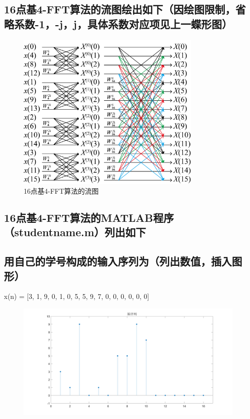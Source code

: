 \documentclass{../source/Experiment}
\begin{document}
\subsection{16点基4-FFT算法的流图绘出如下（因绘图限制，省略系数-1，-j，j，具体系数对应项见上一蝶形图）}
\begin{figure}[H]
    \centering
    \includegraphics[width = 0.8\textwidth]{pic/butterfly3.png}
    \caption{16点基4-FFT算法的流图}
\end{figure}
\subsection{16点基4-FFT算法的MATLAB程序（studentname.m）列出如下}

\subsection{用自己的学号构成的输入序列为（列出数值，插入图形）}
x(n) = [3, 1, 9, 0, 1, 0, 5, 5, 9, 7, 0, 0, 0, 0, 0, 0]
\begin{figure}[H]
    \centering
    \includegraphics[width = 1.0\textwidth]{src/exp3_1.png}
\end{figure}
\end{document}
